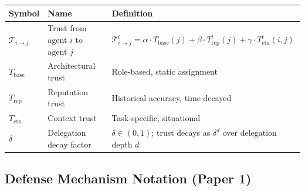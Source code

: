 \documentclass[
]{article}
\newcounter{none} %
\begin{document}
{\def\LTcaptype{none} %
\begin{longtable}[]{@{}
  >{\raggedright\arraybackslash}p{}
  >{\raggedright\arraybackslash}p{}
  >{\raggedright\arraybackslash}p{}@{}}
\toprule\noalign{}
\begin{minipage}[b]{\linewidth}\raggedright
Symbol
\end{minipage} & \begin{minipage}[b]{\linewidth}\raggedright
Name
\end{minipage} & \begin{minipage}[b]{\linewidth}\raggedright
Definition
\end{minipage} \\
\midrule\noalign{}
\endhead
\bottomrule\noalign{}
\endlastfoot
\(\mathcal{T}_{i \to j}\) & Trust from agent \(i\) to agent \(j\) &
\(\mathcal{T}_{i \to j}^t = \alpha \cdot T_{\text{base}}(j) + \beta \cdot T_{\text{rep}}^t(j) + \gamma \cdot T_{\text{ctx}}^t(i,j)\) \\
\(T_{\text{base}}\) & Architectural trust & Role-based, static
assignment \\
\(T_{\text{rep}}\) & Reputation trust & Historical accuracy,
time-decayed \\
\(T_{\text{ctx}}\) & Context trust & Task-specific, situational \\
\(\delta\) & Delegation decay factor & \(\delta \in (0,1)\); trust
decays as \(\delta^d\) over delegation depth \(d\) \\
\end{longtable}
}

\subsection{Defense Mechanism Notation (Paper
1)}\label{defense-mechanism-notation-paper-1}
\end{document}
